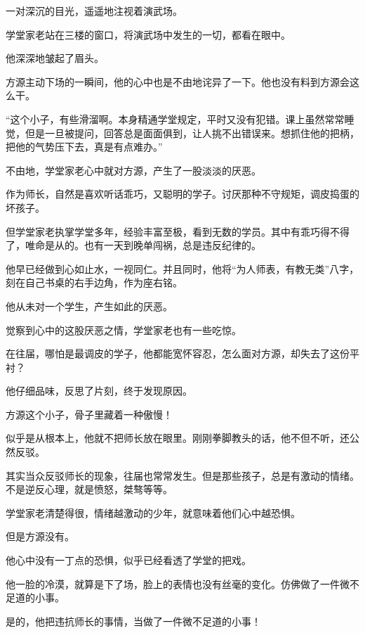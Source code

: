 
\begin{this_body}



一对深沉的目光，遥遥地注视着演武场。

学堂家老站在三楼的窗口，将演武场中发生的一切，都看在眼中。

他深深地皱起了眉头。

方源主动下场的一瞬间，他的心中也是不由地诧异了一下。他也没有料到方源会这么干。

“这个小子，有些滑溜啊。本身精通学堂规定，平时又没有犯错。课上虽然常常睡觉，但是一旦被提问，回答总是面面俱到，让人挑不出错误来。想抓住他的把柄，把他的气势压下去，真是有点难办。”

不由地，学堂家老心中就对方源，产生了一股淡淡的厌恶。

作为师长，自然是喜欢听话乖巧，又聪明的学子。讨厌那种不守规矩，调皮捣蛋的坏孩子。

但学堂家老执掌学堂多年，经验丰富至极，看到无数的学员。其中有乖巧得不得了，唯命是从的。也有一天到晚单闯祸，总是违反纪律的。

他早已经做到心如止水，一视同仁。并且同时，他将“为人师表，有教无类”八字，刻在自己书桌的右手边角，作为座右铭。

他从未对一个学生，产生如此的厌恶。

觉察到心中的这股厌恶之情，学堂家老也有一些吃惊。

在往届，哪怕是最调皮的学子，他都能宽怀容忍，怎么面对方源，却失去了这份平衬？

他仔细品味，反思了片刻，终于发现原因。

方源这个小子，骨子里藏着一种傲慢！

似乎是从根本上，他就不把师长放在眼里。刚刚拳脚教头的话，他不但不听，还公然反驳。

其实当众反驳师长的现象，往届也常常发生。但是那些孩子，总是有激动的情绪。不是逆反心理，就是愤怒，桀骜等等。

学堂家老清楚得很，情绪越激动的少年，就意味着他们心中越恐惧。

但是方源没有。

他心中没有一丁点的恐惧，似乎已经看透了学堂的把戏。

他一脸的冷漠，就算是下了场，脸上的表情也没有丝毫的变化。仿佛做了一件微不足道的小事。

是的，他把违抗师长的事情，当做了一件微不足道的小事！


\end{this_body}
